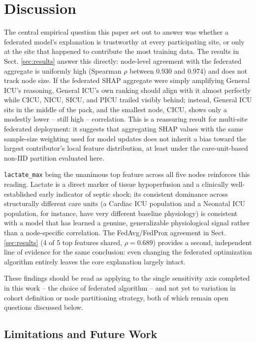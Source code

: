 \documentclass[runningheads]{llncs}
\begin{document}
\section{Discussion}\label{sec:discussion}

The central empirical question this paper set out to answer was whether a federated model's explanation is trustworthy at every participating site, or only at the site that happened to contribute the most training data. The results in Sect. \ref{sec:results} answer this directly: node-level agreement with the federated aggregate is uniformly high (Spearman $\rho$ between 0.930 and 0.974) and does not track node size. If the federated SHAP aggregate were simply amplifying General ICU's reasoning, General ICU's own ranking should align with it almost perfectly while CICU, NICU, SICU, and PICU trailed visibly behind; instead, General ICU sits in the middle of the pack, and the smallest node, CICU, shows only a modestly lower -- still high -- correlation. This is a reassuring result for multi-site federated deployment: it suggests that aggregating SHAP values with the same sample-size weighting used for model updates does not inherit a bias toward the largest contributor's local feature distribution, at least under the care-unit-based non-IID partition evaluated here.

\texttt{lactate\_max} being the unanimous top feature across all five nodes reinforces this reading. Lactate is a direct marker of tissue hypoperfusion and a clinically well-established early indicator of septic shock; its consistent dominance across structurally different care units (a Cardiac ICU population and a Neonatal ICU population, for instance, have very different baseline physiology) is consistent with a model that has learned a genuine, generalizable physiological signal rather than a node-specific correlation. The FedAvg/FedProx agreement in Sect. \ref{sec:results} (4 of 5 top features shared, $\rho = 0.689$) provides a second, independent line of evidence for the same conclusion: even changing the federated optimization algorithm entirely leaves the core explanation largely intact.

These findings should be read as applying to the single sensitivity axis completed in this work -- the choice of federated algorithm -- and not yet to variation in cohort definition or node partitioning strategy, both of which remain open questions discussed below.

\subsection{Limitations and Future Work}\label{subsec:limitations}
\end{document}
